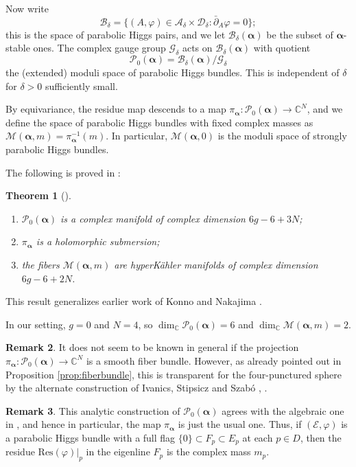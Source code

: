 \documentclass[12pt,letterpaper,reqno]{amsart}
\def\mathbf#1{#1}%
\newtheorem{thm}{Theorem}
\theoremstyle{remark}
\theoremstyle{definition}
\newtheorem{rem}[thm]{Remark}
\numberwithin{thm}{section}
\numberwithin{equation}{section}
\numberwithin{figure}{section}
\newcommand{\C}{\ensuremath{\mathbb C}}
\newcommand{\calA}{\mathcal A}
\newcommand{\calB}{\mathcal B}
\newcommand{\calD}{\mathcal D}
\newcommand{\calG}{\mathcal G}
\newcommand{\calP}{\mathcal P}
\newcommand{\calM}{\mathcal M}
\newcommand{\cE}{{\mathcal E}}
\newcommand{\del}{{\partial}}
\newcommand{\bsa}{\boldsymbol{\alpha}}
\newcommand{\bfm}{\mathbf{m}}
\begin{document}
Now write
\[
\calB_\delta = \{ (A,\varphi) \in \calA_\delta \times \calD_\delta : \bar\del_A \varphi = 0 \};
\]
this is the space of parabolic Higgs pairs, and we let $\calB_\delta(\bsa)$ be the subset of $\bsa$-stable ones.
The complex gauge group $\calG_\delta$ acts on $\calB_\delta(\bsa)$ with quotient
\[
\calP_0(\bsa) = \calB_\delta(\bsa) / \calG_\delta
\]
the (extended) moduli space of parabolic Higgs bundles. This is independent of $\delta$ for $\delta > 0$ sufficiently small. 

By equivariance, the residue map descends to a map $\pi_{\bsa} : \calP_0(\bsa) \to \C^N$, and we define the space of parabolic Higgs bundles with fixed
complex masses as $\calM(\bsa,\bfm) = \pi_{\bsa}^{-1}(\bfm)$.
In particular, $\calM(\bsa, \mathbf{0})$ is the moduli space of strongly parabolic Higgs bundles.

The following is proved in \cite{collier2024conformallimitsparabolicslnchiggs}:
\begin{thm}[\cite{collier2024conformallimitsparabolicslnchiggs}]\ \label{thm:CFW}
\begin{enumerate}
\item $\calP_0(\bsa)$ is a complex manifold of complex dimension $6g-6 + 3N$;
\item $\pi_{\bsa}$ is a holomorphic submersion;
\item the fibers $\calM(\bsa,\bfm)$ are hyperK\"ahler manifolds of complex dimension $6g-6 + 2N$.
\end{enumerate}
\end{thm}
This result generalizes earlier work of Konno \cite{konno93} and Nakajima \cite{Nakajima}. 

In our setting, $g=0$ and $N=4$, so $\dim_\C\mathcal{P}_0(\bsa) = 6$ and $\dim_\C \calM(\bsa, \bfm)=2$.

\begin{rem}\label{rem:bundle}
It does not seem to be known in general if the projection $\pi_{\bsa} : \calP_0(\bsa) \rightarrow \C^N$ is a smooth fiber bundle. However, as already pointed
out in Proposition \ref{prop:fiberbundle}, this is transparent for the four-punctured sphere by the alternate construction of Ivanics, Stipsicz and Szab\'o \cite{ISS19a}, \cite{ISS19b}.
\end{rem}

\begin{rem}  This analytic construction of $\calP_0(\bsa)$ agrees with the algebraic one in \cite{yokogawa93}, and hence in particular, the map $\pi_{\bsa}$
is just the usual one. Thus, if $(\cE, \varphi)$ is a parabolic Higgs bundle with a full flag $\{0\} \subset F_p \subset E_p$ at each $p \in D$, then
the residue $\mathrm{Res}(\varphi)\Big|_p$ in the eigenline $F_p$ is the complex mass $m_p$.
\end{rem}
\end{document}
